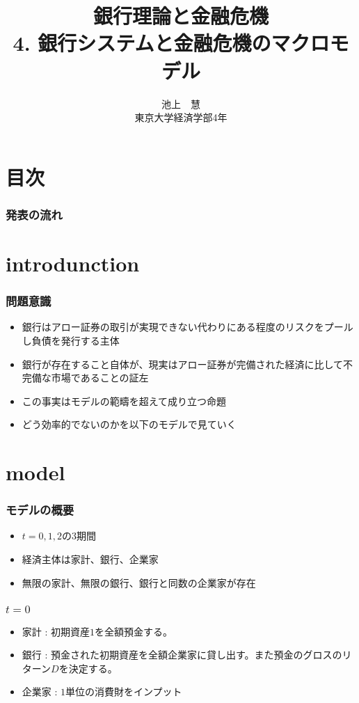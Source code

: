 \documentclass[dvipdfmx, 12pt]{beamer}
\title{銀行理論と金融危機\\4. 銀行システムと金融危機のマクロモデル}
\author{池上　慧 \\ 東京大学経済学部4年}
\begin{document}
\newcommand{\argmin}{\mathop{\rm arg~min}\limits}

\frame{\maketitle}

\section*{目次}
\begin{frame} \frametitle{発表の流れ}
\tableofcontents
\end{frame}

\section{introdunction}
\begin{frame}\frametitle{問題意識}
	\begin{itemize}
		\item 銀行はアロー証券の取引が実現できない代わりにある程度のリスクをプールし負債を発行する主体
		\item 銀行が存在すること自体が、現実はアロー証券が完備された経済に比して不完備な市場であることの証左
		\item この事実はモデルの範疇を超えて成り立つ命題
		\item どう効率的でないのかを以下のモデルで見ていく
	\end{itemize}
\end{frame}

\section{model}
\begin{frame}\frametitle{モデルの概要}
	\begin{itemize}
		\item $t = 0,1,2$の3期間
		\item 経済主体は家計、銀行、企業家
		\item 無限の家計、無限の銀行、銀行と同数の企業家が存在
	\end{itemize}
\end{frame}

\begin{frame}\frametitle{$t = 0$}
	\begin{itemize}
		\item 家計 : 初期資産$1$を全額預金する。
		\item 銀行 : 預金された初期資産を全額企業家に貸し出す。また預金のグロスのリターン$D$を決定する。
		\item 企業家 : $1$単位の消費財をインプット
	\end{itemize}
\end{frame}
\end{document}
